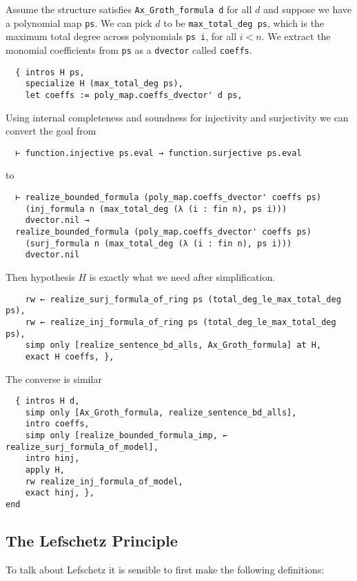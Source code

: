 Assume the structure satisfies \texttt{Ax\_Groth\_formula d} for all $d$ and
suppose we have a polynomial map \texttt{ps}.
We can pick $d$ to be \texttt{max\_total\_deg ps},
which is the maximum total degree across polynomials \texttt{ps i},
for all $i < n$.
We extract the monomial coefficients from \texttt{ps} as a \texttt{dvector}
called \texttt{coeffs}.

\begin{lstlisting}
  { intros H ps,
    specialize H (max_total_deg ps),
    let coeffs := poly_map.coeffs_dvector' d ps, \end{lstlisting}

Using internal completeness and soundness for injectivity and surjectivity
we can convert the goal from
\begin{lstlisting}
  ⊢ function.injective ps.eval → function.surjective ps.eval \end{lstlisting}
to
\begin{lstlisting}
  ⊢ realize_bounded_formula (poly_map.coeffs_dvector' coeffs ps)
    (inj_formula n (max_total_deg (λ (i : fin n), ps i)))
    dvector.nil →
  realize_bounded_formula (poly_map.coeffs_dvector' coeffs ps)
    (surj_formula n (max_total_deg (λ (i : fin n), ps i)))
    dvector.nil \end{lstlisting}

Then hypothesis $H$ is exactly what we need after simplification.

\begin{lstlisting}
    rw ← realize_surj_formula_of_ring ps (total_deg_le_max_total_deg ps),
    rw ← realize_inj_formula_of_ring ps (total_deg_le_max_total_deg ps),
    simp only [realize_sentence_bd_alls, Ax_Groth_formula] at H,
    exact H coeffs, }, \end{lstlisting}

The converse is similar
\begin{lstlisting}
  { intros H d,
    simp only [Ax_Groth_formula, realize_sentence_bd_alls],
    intro coeffs,
    simp only [realize_bounded_formula_imp, ← realize_surj_formula_of_model],
    intro hinj,
    apply H,
    rw realize_inj_formula_of_model,
    exact hinj, },
end
\end{lstlisting}

\subsection{The Lefschetz Principle}

To talk about Lefschetz it is sensible to first make the following definitions:


